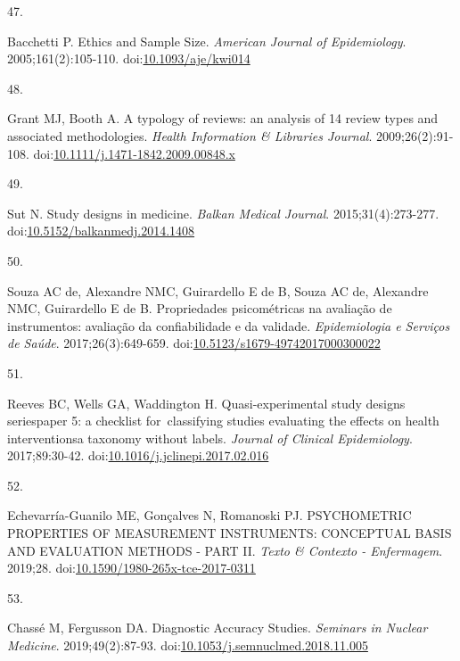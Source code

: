 \documentclass[
]{book}
\newlength{\cslhangindent}
\newlength{\csllabelwidth}
\newlength{\cslentryspacingunit} %
\newenvironment{CSLReferences}[2] %
 {%
  \setlength{\parindent}{0pt}
  \ifodd #1
  \let\oldpar\par
  \def\par{\hangindent=\cslhangindent\oldpar}
  \fi
  \setlength{\parskip}{#2\cslentryspacingunit}
 }%
 {}
\newcommand{\CSLLeftMargin}[1]{\parbox[t]{\csllabelwidth}{#1}}
\newcommand{\CSLRightInline}[1]{\parbox[t]{\linewidth - \csllabelwidth}{#1}\break}
\begin{document}
\begin{CSLReferences}{0}{0}
\leavevmode{}%
\CSLLeftMargin{47. }%
\CSLRightInline{Bacchetti P. Ethics and Sample Size. \emph{American Journal of Epidemiology}. 2005;161(2):105-110. doi:\href{https://doi.org/10.1093/aje/kwi014}{10.1093/aje/kwi014}}

\leavevmode{}%
\CSLLeftMargin{48. }%
\CSLRightInline{Grant MJ, Booth A. A typology of reviews: an analysis of 14 review types and associated methodologies. \emph{Health Information \& Libraries Journal}. 2009;26(2):91-108. doi:\href{https://doi.org/10.1111/j.1471-1842.2009.00848.x}{10.1111/j.1471-1842.2009.00848.x}}

\leavevmode{}%
\CSLLeftMargin{49. }%
\CSLRightInline{Sut N. Study designs in medicine. \emph{Balkan Medical Journal}. 2015;31(4):273-277. doi:\href{https://doi.org/10.5152/balkanmedj.2014.1408}{10.5152/balkanmedj.2014.1408}}

\leavevmode{}%
\CSLLeftMargin{50. }%
\CSLRightInline{Souza AC de, Alexandre NMC, Guirardello E de B, Souza AC de, Alexandre NMC, Guirardello E de B. Propriedades psicométricas na avaliação de instrumentos: avaliação da confiabilidade e da validade. \emph{Epidemiologia e Serviços de Saúde}. 2017;26(3):649-659. doi:\href{https://doi.org/10.5123/s1679-49742017000300022}{10.5123/s1679-49742017000300022}}

\leavevmode{}%
\CSLLeftMargin{51. }%
\CSLRightInline{Reeves BC, Wells GA, Waddington H. Quasi-experimental study designs series{\textemdash}paper 5: a checklist for~classifying studies evaluating the effects on health interventions{\textemdash}a taxonomy without labels. \emph{Journal of Clinical Epidemiology}. 2017;89:30-42. doi:\href{https://doi.org/10.1016/j.jclinepi.2017.02.016}{10.1016/j.jclinepi.2017.02.016}}

\leavevmode{}%
\CSLLeftMargin{52. }%
\CSLRightInline{Echevarría-Guanilo ME, Gonçalves N, Romanoski PJ. PSYCHOMETRIC PROPERTIES OF MEASUREMENT INSTRUMENTS: CONCEPTUAL BASIS AND EVALUATION METHODS - PART II. \emph{Texto \& Contexto - Enfermagem}. 2019;28. doi:\href{https://doi.org/10.1590/1980-265x-tce-2017-0311}{10.1590/1980-265x-tce-2017-0311}}

\leavevmode{}%
\CSLLeftMargin{53. }%
\CSLRightInline{Chassé M, Fergusson DA. Diagnostic Accuracy Studies. \emph{Seminars in Nuclear Medicine}. 2019;49(2):87-93. doi:\href{https://doi.org/10.1053/j.semnuclmed.2018.11.005}{10.1053/j.semnuclmed.2018.11.005}}


\end{CSLReferences}
\end{document}
